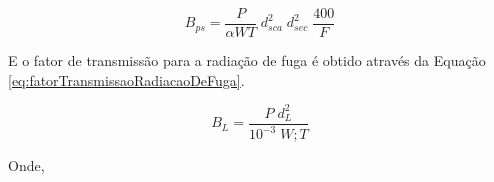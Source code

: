 \documentclass[11pt,a4paper]{article}
\begin{document}
            \begin{equation}
                B_{ps} = \frac{P}{\alpha W T} \; d_{sca}^2 \; d_{sec}^2 \; \frac{400}{F}
                \label{eq:BarreiraSecundariaEspalhamentoPaciente}
            \end{equation}

            E o fator de transmissão para a radiação de fuga é obtido através da Equação \ref{eq:fatorTransmissaoRadiacaoDeFuga}.

                \begin{equation}
                    B_L = \frac{P \; d_L^2}{10^{-3} \; W ; T}
                    \label{eq:fatorTransmissaoRadiacaoDeFuga}
                \end{equation}

            Onde, 
\end{document}
